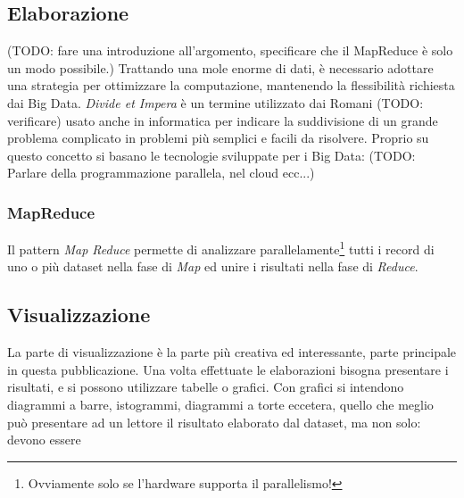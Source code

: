 \subsection{Elaborazione} (TODO: fare una introduzione all'argomento, specificare che il MapReduce è solo un modo possibile.)
Trattando una mole enorme di dati, è necessario adottare una strategia per ottimizzare la computazione, mantenendo la flessibilità richiesta dai Big Data. \emph{Divide et Impera} è un termine utilizzato dai Romani (TODO: verificare) usato anche in informatica per indicare la suddivisione di un grande problema complicato in problemi più semplici e facili da risolvere. Proprio su questo concetto si basano le tecnologie sviluppate per i Big Data:
(TODO: Parlare della programmazione parallela, nel cloud ecc...)
\subsubsection{MapReduce}\label{sec:mapreduce}
Il pattern \emph{Map Reduce} permette di analizzare parallelamente\footnote{Ovviamente solo se l'hardware supporta il parallelismo!} tutti i record di uno o più dataset nella fase di \emph{Map} ed unire i risultati nella fase di \emph{Reduce}.
\subsection{Visualizzazione}
La parte di visualizzazione è la parte più creativa ed interessante, parte principale in questa pubblicazione. Una volta effettuate le elaborazioni bisogna presentare i risultati, e si possono utilizzare tabelle o grafici. Con grafici si intendono diagrammi a barre, istogrammi, diagrammi a torte eccetera, quello che meglio può presentare ad un lettore il risultato elaborato dal dataset, ma non solo: devono essere














